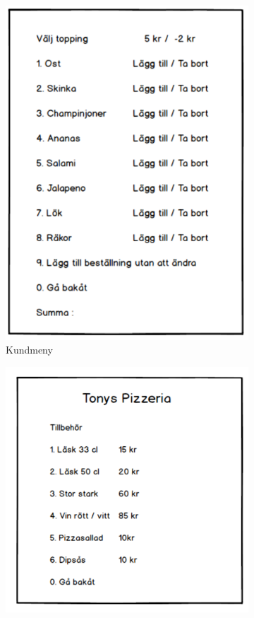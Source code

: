 \documentclass{article}
\theoremstyle{remark}                                         %
\begin{document}
\begin{figure}
\begin{subfigure}[b]{0.3\textwidth}
        \includegraphics[width=\textwidth]{img/Skissbilder/scree6.PNG}
        \caption{Kundmeny}
    \end{subfigure}
        \begin{subfigure}[b]{0.3\textwidth}
        \includegraphics[width=\textwidth]{img/Skissbilder/Screen9.PNG}

\end{subfigure}
\end{figure}
\end{document}
